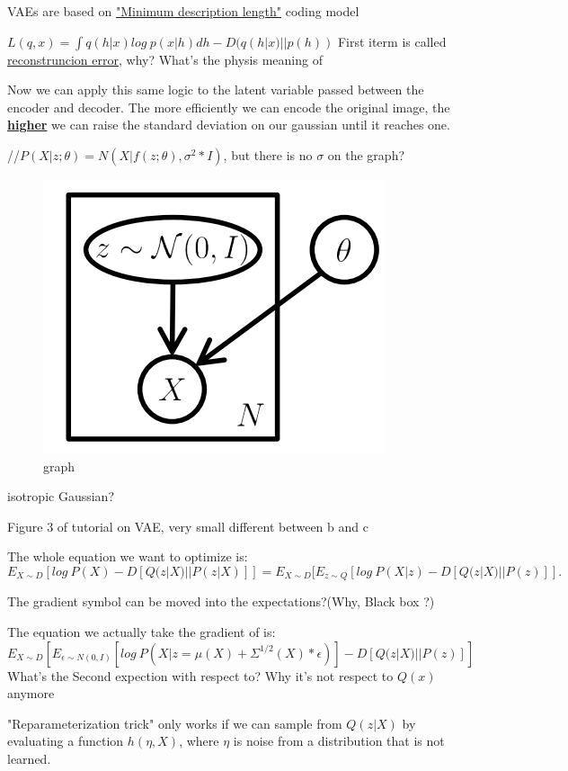 \documentclass{article}
\begin{document}
VAEs are based on \underline{"Minimum description length"} coding model


$L(q,x) = \int q(h|x)log\ p(x|h)dh - D(q(h|x)||p(h))$
First iterm is called \underline{reconstruncion error}, why? What's the physis meaning of  


Now we can apply this same logic to the latent variable passed between the encoder and decoder. The more efficiently we can encode the original image, the \underline{\textbf{higher}} we can raise the standard deviation on our gaussian until it reaches one.


//$P(X|z;\theta) = N(X|f(z;\theta),\sigma^2 * I)$, but there is no $\sigma$ on the graph?

\begin{figure}
\centering
\includegraphics[width = .5\textwidth]{model.png}
\caption{graph}
\label{fig:data}
\end{figure}


isotropic Gaussian?


Figure 3 of tutorial on VAE, very small different between b and c


The whole equation we want to optimize is:
\begin{equation}
E_{X\sim D}[log\ P(X)- D[Q(z|X)||P(z|X)]] = E_{X\sim D}[E_{z\sim Q}[log\ P(X|z) - D[Q(z|X)||P(z)]].
\end{equation}

The gradient symbol can be moved into the expectations?(Why, Black box ?)


The equation we actually take the gradient of is:
\begin{equation}
E_{X\sim D}[E_{\epsilon \sim N(0, I)}[log\ P(X|z=\mu(X)+\Sigma^{1/2}(X)*\epsilon)]- D[Q(z|X)||P(z)]]
\end{equation}
What's the Second expection with respect to? Why it's not respect to $Q(x)$ anymore


"Reparameterization trick" only works if we can sample from $Q(z|X)$ by evaluating a function $h(\eta, X)$, where $\eta$ is noise from a distribution that is not learned.
\end{document}
